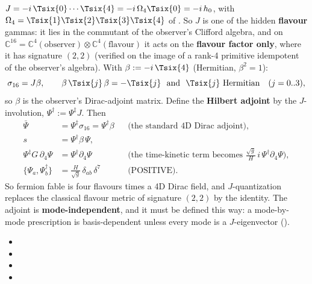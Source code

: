 $J=-i\,\Tsix{0}\cdots\Tsix{4}=-i\,\Omega_4\Tsix{0}=-i\,h_0$, with
$\Omega_4=\Tsix{1}\Tsix{2}\Tsix{3}\Tsix{4}$ of . So $J$ is one of the hidden
\textbf{flavour} gammas: it lies in the commutant of the observer's Clifford algebra, and on
$\mathbb C^{16}=\mathbb C^4(\text{observer})\otimes\mathbb C^4(\text{flavour})$ it acts on the
\textbf{flavour factor only}, where it has signature $(2,2)$ (verified on the image of a rank-4
primitive idempotent of the observer's algebra). With $\beta:=-i\,\Tsix{4}$ (Hermitian,
$\beta^2=1$):
\[
  \sigma_{16}=J\beta,\qquad \beta\,\Tsix{j}\,\beta=-\Tsix{j}\ \text{ and }\ \Tsix{j}\ \text{Hermitian}\quad(j=0..3),
\]
so $\beta$ is the observer's Dirac-adjoint matrix. Define the \textbf{Hilbert adjoint} by the
$J$-involution, $\Psi^{\dagger}:=\Psi^{\ddagger}J$. Then
\begin{align*}
  \bar\Psi&=\Psi^{\ddagger}\sigma_{16}=\Psi^{\dagger}\beta &&\text{(the standard 4D Dirac adjoint)},\\
  s&=\Psi^{\dagger}\beta\,\Psi,\\
  \Psi^{\ddagger}G\,\partial_4\Psi&=\Psi^{\dagger}\partial_4\Psi &&\text{(the time-kinetic term becomes } \tfrac{\sqrt g}{H}\,i\,\Psi^{\dagger}\partial_4\Psi\text{)},\\
  \{\Psi_a,\Psi^{\dagger}_b\}&=\frac{H}{\sqrt g}\,\delta_{ab}\,\delta^7 &&\text{(POSITIVE)}.
\end{align*}
So fermion fable is four flavours times a 4D Dirac field, and $J$-quantization replaces the classical
flavour metric of signature $(2,2)$ by the identity. The adjoint is \textbf{mode-independent}, and it
must be defined this way: a mode-by-mode prescription is basis-dependent unless every mode is a
$J$-eigenvector (). 
\begin{itemize}
  \item {}
  \item {}
  \item {}
  \item {}
\end{itemize}

